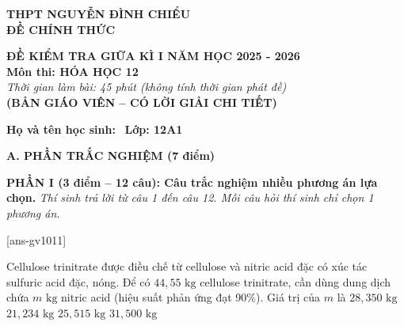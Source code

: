 \documentclass[12pt,a4paper]{article}
\begin{document}
\thispagestyle{firstpage}

\noindent
\begin{minipage}[t]{0.42\textwidth}
	\centering\fontsize{10pt}{12pt}\selectfont
	\textbf{THPT NGUYỄN ĐÌNH CHIỂU}\\
	\textbf{ĐỀ CHÍNH THỨC}\\
\end{minipage}\hfill
\begin{minipage}[t]{0.56\textwidth}
	\centering\small
	\textbf{ĐỀ KIỂM TRA GIỮA KÌ I NĂM HỌC 2025 - 2026}\\
	\textbf{Môn thi: HÓA HỌC 12}\\
	\textit{Thời gian làm bài: 45 phút (không tính thời gian phát đề)}\\
	\textbf{\color{hfRed}(BẢN GIÁO VIÊN -- CÓ LỜI GIẢI CHI TIẾT)}
\end{minipage}

\smallskip
\noindent\hrulefill
\smallskip

\noindent\textbf{Họ và tên học sinh:} \dotfill\ \textbf{Lớp: 12A1}

\medskip
\noindent
\textbf{A. PHẦN TRẮC NGHIỆM (7 điểm)}

\smallskip
\noindent
\textbf{PHẦN I (3 điểm -- 12 câu): Câu trắc nghiệm nhiều phương án lựa chọn.} \textit{Thí sinh trả lời từ câu 1 đến câu 12. Mỗi câu hỏi thí sinh chỉ chọn 1 phương án.}

[ans-gv1011]

\begin{ex}
Cellulose trinitrate được điều chế từ cellulose và nitric acid đặc có xúc tác sulfuric acid đặc, nóng. Để có $44{,}55\text{ kg}$ cellulose trinitrate, cần dùng dung dịch chứa $m\text{ kg}$ nitric acid (hiệu suất phản ứng đạt 90\%). Giá trị của $m$ là
\choice
{$28{,}350\text{ kg}$}
{$21{,}234\text{ kg}$}
{$25{,}515\text{ kg}$}
{\True $31{,}500\text{ kg}$}
\end{ex}
\end{document}
